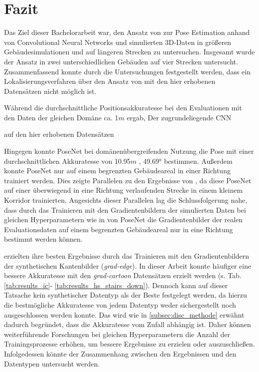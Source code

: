 
\section{Fazit}
\label{sec:kapitel_6}
Das Ziel dieser Bachelorarbeit war, den Ansatz von \citet{acharyaBIMPoseNetIndoorCamera2019} zur Pose Estimation anhand von Convolutional Neural Networks und simulierten 3D-Daten in größeren Gebäudesimulationen und auf längeren Strecken zu untersuchen.
Insgesamt wurde der Ansatz in zwei unterschiedlichen Gebäuden auf vier Strecken untersucht. Zusammenfassend konnte durch die Untersuchungen festgestellt werden, dass ein Lokalisierungsverfahren über den Ansatz von \citet{acharyaBIMPoseNetIndoorCamera2019} mit den hier erhobenen Datensätzen nicht möglich ist.


Während die durchschnittliche Positionsakkuratesse bei den Evaluationen mit den Daten der gleichen Domäne ca. 1$m$ ergab,
Der zugrundeliegende CNN 
%

%

auf den hier erhobenen Datensätzen 

Hingegen konnte PoseNet bei domänenübergreifenden Nutzung die Pose mit einer durchschnittlichen Akkuratesse von 10.95$m$ , 49.69° bestimmen. Außerdem konnte PoseNet nur auf einem begrenzten Gebäudeareal in einer Richtung trainiert werden. Dies zeigte Parallelen zu den Ergebnisse von \citet{acharyaBIMPoseNetIndoorCamera2019}, da diese PoseNet auf einer überwiegend in eine Richtung verlaufenden Strecke in einem kleinem Korridor trainierten. Angesichts dieser Parallelen lag die Schlussfolgerung nahe, dass durch das Trainieren mit den Gradientenbildern der simulierten Daten bei gleichen Hyperparametern wie in \cite{acharyaBIMPoseNetIndoorCamera2019} von PoseNet die Gradientenbilder der realen Evaluationsdaten auf einem begrenzten Gebäudeareal nur in eine Richtung bestimmt werden können.



\citet{acharyaBIMPoseNetIndoorCamera2019} erzielten ihre besten Ergebnisse durch das Trainieren mit den Gradientenbildern der synthetischen Kantenbilder (\textit{grad-edge}). In dieser Arbeit konnte häufiger eine bessere Akkuratesse mit den \textit{grad-cartoon} Datensätzen erzielt werden (s. Tab. \ref{tab:results_ic}- \ref{tab:results_hs_stairs_down}). Dennoch kann auf dieser Tatsache kein synthetischer Datentyp als der Beste festgelegt werden, da hierzu die bestmögliche Akkuratesse von jedem Datentyp weder sichergestellt noch ausgeschlossen werden konnte. Das wird wie in \ref{subsec:disc_methode} erwähnt dadurch begründet, dass die Akkuratesse vom Zufall abhängig ist. Daher können weiterführende Forschungen bei gleichen Hyperparametern die Anzahl der Trainingsprozesse erhöhen, um bessere Ergebnisse zu erzielen oder auszuschließen. Infolgedessen könnte der Zusammenhang zwischen den Ergebnissen und den Datentypen untersucht werden. 

